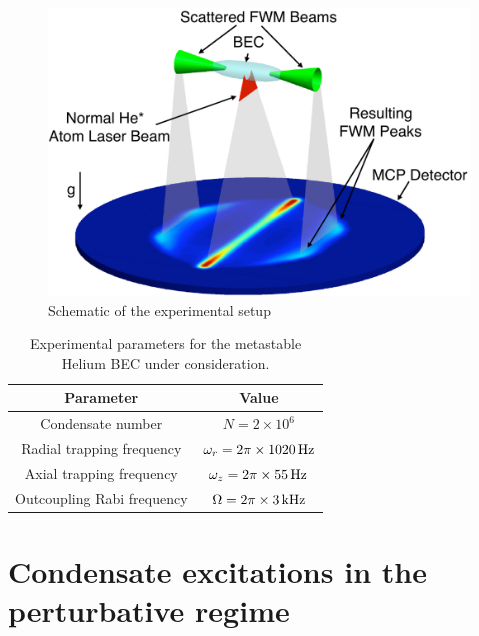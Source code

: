\begin{figure}
    \centering
        \includegraphics[height=3in]{Schematic}
    \caption{Schematic of the experimental setup}
    \label{Peaks:Schematic}
\end{figure}


\begin{table}
    \centering
    \begin{tabular}{cc}
    \toprule
    Parameter & Value\\
    \midrule
    Condensate number & $N = 2\times 10^6$\\
    Radial trapping frequency & $\omega_r = 2 \pi \times \unit[1020]{Hz}$\\
    Axial trapping frequency & $\omega_z = 2\pi \times \unit[55]{Hz}$\\
    Outcoupling Rabi frequency & $\Omega = 2\pi \times \unit[3]{kHz}$\\
    \bottomrule
    \end{tabular}
    \caption{Experimental parameters for the metastable Helium BEC under consideration.}
    \label{Peaks:ExperimentalParameters}
\end{table}

\clearpage
\section{Condensate excitations in the perturbative regime}
\label{Peaks:PerturbativeApproach}


